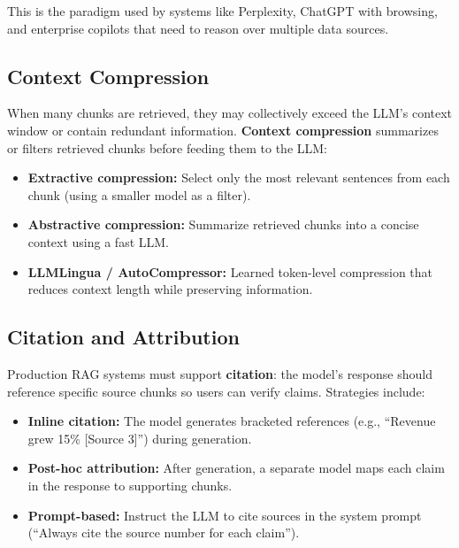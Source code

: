 This is the paradigm used by systems like Perplexity, ChatGPT with browsing,
and enterprise copilots that need to reason over multiple data sources.

\subsection{Context Compression}

When many chunks are retrieved, they may collectively exceed the LLM's context
window or contain redundant information.  \textbf{Context compression}
summarizes or filters retrieved chunks before feeding them to the LLM:
\begin{itemize}
    \item \textbf{Extractive compression:} Select only the most relevant
          sentences from each chunk (using a smaller model as a filter).
    \item \textbf{Abstractive compression:} Summarize retrieved chunks into a
          concise context using a fast LLM.
    \item \textbf{LLMLingua / AutoCompressor:} Learned token-level compression
          that reduces context length while preserving information.
\end{itemize}

\subsection{Citation and Attribution}

Production RAG systems must support \textbf{citation}: the model's response
should reference specific source chunks so users can verify claims.  Strategies
include:
\begin{itemize}
    \item \textbf{Inline citation:} The model generates bracketed references
          (e.g., ``Revenue grew 15\% [Source 3]'') during generation.
    \item \textbf{Post-hoc attribution:} After generation, a separate model
          maps each claim in the response to supporting chunks.
    \item \textbf{Prompt-based:} Instruct the LLM to cite sources in the system
          prompt (``Always cite the source number for each claim'').
\end{itemize}


